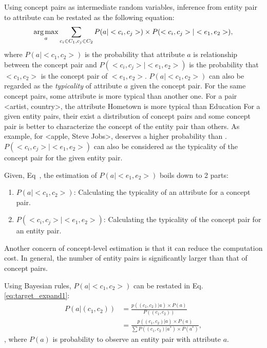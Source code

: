 Using concept pairs as intermediate random variables, inference from entity pair to attribute can be restated as the following equation:
\begin{equation}
\label{eq:target}
\operatorname*{arg\,max}_a \sum_{c_i\in C_1 , c_j \in C_2 }P(a|<c_{i},c_{j}>)\times P(<c_{i},c_{j}>|<e_{1},e_{2}>),
\end{equation}
where $P(a|<c_{1},c_{2}>)$ is the probability that attribute $a$ is relationship between the concept pair
and $P(<c_{i},c_{j}>|<e_{1},e_{2}>)$ is the probability that $<c_1, c_2>$ is the concept pair of $<e_1, e_2>$.
$P(a|<c_{1},c_{2}>)$ can also be regarded as the {\it typicality} of attribute $a$ given the concept pair.
For the same concept pairs, some attribute is more typical than another one.
For a pair \ac{<artist, country>}, the attribute \ac{Hometown} is more typical than \ac{Education}
For a given entity pairs, their exist a distribution of concept pairs and some concept pair is better to characterize the concept of the entity pair than others.
As example,  for \ac{<apple, Steve Jobs>},   deserves a higher probability than .
$P(<c_{i},c_{j}>|<e_{1},e_{2}>)$ can also be considered as the typicality of the concept pair for the given entity pair.

Given, Eq~\label{eq:target}, the estimation of $P(a|<e_1,e_2>)$ boils down to 2 parts:
\begin{enumerate}
\item $P(a|<c_{1},c_{2}>)$: Calculating the typicality of an attribute for a concept pair.
\item $P(<c_{i},c_{j}>|<e_{1},e_{2}>)$: Calculating the typicality of the concept pair for an entity pair.
\end{enumerate}

Another concern of concept-level estimation is that it can reduce the computation cost.
In general, the number of entity pairs is significantly larger than that of concept pairs.

Using Bayesian rules, $P(a|<c_{1},c_{2}>)$ can be restated in Eq.\ref{eq:target_expand1}:
\begin{equation}
\label{eq:target_expand1}
\begin{split}
P(a|(c_{1},c_{2})) &= \frac{ p((c_{1},c_{2})|a)\times P(a) }{ P( (c_{1},c_{2}) ) }\\
&=\frac{ p((c_{1},c_{2})|a)\times P(a) }{ \sum{P( (c_{1},c_{2})|a^* )\times P(a^*)   } },
\end{split}
\end{equation},
where $P(a)$ is probability to observe an entity pair with attribute $a$.

